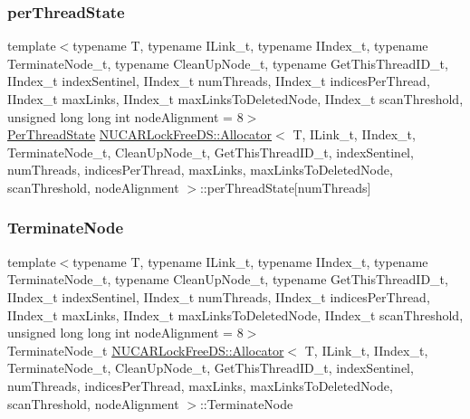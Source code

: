 \subsubsection{\texorpdfstring{per\+Thread\+State}{perThreadState}}
{\footnotesize\ttfamily template$<$typename T, typename I\+Link\+\_\+t, typename I\+Index\+\_\+t, typename Terminate\+Node\+\_\+t, typename Clean\+Up\+Node\+\_\+t, typename Get\+This\+Thread\+I\+D\+\_\+t, I\+Index\+\_\+t index\+Sentinel, I\+Index\+\_\+t num\+Threads, I\+Index\+\_\+t indices\+Per\+Thread, I\+Index\+\_\+t max\+Links, I\+Index\+\_\+t max\+Links\+To\+Deleted\+Node, I\+Index\+\_\+t scan\+Threshold, unsigned long long int node\+Alignment = 8$>$ \\
\mbox{\hyperlink{class_n_u_c_a_r_lock_free_d_s_1_1_allocator_1_1_per_thread_state}{Per\+Thread\+State}} \mbox{\hyperlink{class_n_u_c_a_r_lock_free_d_s_1_1_allocator}{N\+U\+C\+A\+R\+Lock\+Free\+D\+S\+::\+Allocator}}$<$ T, I\+Link\+\_\+t, I\+Index\+\_\+t, Terminate\+Node\+\_\+t, Clean\+Up\+Node\+\_\+t, Get\+This\+Thread\+I\+D\+\_\+t, index\+Sentinel, num\+Threads, indices\+Per\+Thread, max\+Links, max\+Links\+To\+Deleted\+Node, scan\+Threshold, node\+Alignment $>$\+::per\+Thread\+State\mbox{[}num\+Threads\mbox{]}\hspace{0.3cm}{\ttfamily [private]}}

\mbox{\label{class_n_u_c_a_r_lock_free_d_s_1_1_allocator_a14e7ae467e3fefce5ce92aa3017b1568}} 
\subsubsection{\texorpdfstring{Terminate\+Node}{TerminateNode}}
{\footnotesize\ttfamily template$<$typename T, typename I\+Link\+\_\+t, typename I\+Index\+\_\+t, typename Terminate\+Node\+\_\+t, typename Clean\+Up\+Node\+\_\+t, typename Get\+This\+Thread\+I\+D\+\_\+t, I\+Index\+\_\+t index\+Sentinel, I\+Index\+\_\+t num\+Threads, I\+Index\+\_\+t indices\+Per\+Thread, I\+Index\+\_\+t max\+Links, I\+Index\+\_\+t max\+Links\+To\+Deleted\+Node, I\+Index\+\_\+t scan\+Threshold, unsigned long long int node\+Alignment = 8$>$ \\
Terminate\+Node\+\_\+t \mbox{\hyperlink{class_n_u_c_a_r_lock_free_d_s_1_1_allocator}{N\+U\+C\+A\+R\+Lock\+Free\+D\+S\+::\+Allocator}}$<$ T, I\+Link\+\_\+t, I\+Index\+\_\+t, Terminate\+Node\+\_\+t, Clean\+Up\+Node\+\_\+t, Get\+This\+Thread\+I\+D\+\_\+t, index\+Sentinel, num\+Threads, indices\+Per\+Thread, max\+Links, max\+Links\+To\+Deleted\+Node, scan\+Threshold, node\+Alignment $>$\+::Terminate\+Node\hspace{0.3cm}{\ttfamily [private]}}

